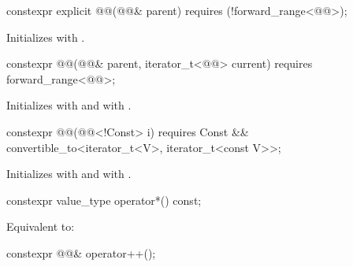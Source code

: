 %
\begin{itemdecl}
constexpr explicit @@(@@& parent)
  requires (!forward_range<@@>);
\end{itemdecl}

\begin{itemdescr}
\pnum
\effects
Initializes  with .
\end{itemdescr}

%
\begin{itemdecl}
constexpr @@(@@& parent, iterator_t<@@> current)
  requires forward_range<@@>;
\end{itemdecl}

\begin{itemdescr}
\pnum
\effects
Initializes  with 
and  with .
\end{itemdescr}

%
\begin{itemdecl}
constexpr @@(@@<!Const> i)
  requires Const && convertible_to<iterator_t<V>, iterator_t<const V>>;
\end{itemdecl}

\begin{itemdescr}
\pnum
\effects
Initializes  with  and
 with .
\end{itemdescr}

%
\begin{itemdecl}
constexpr value_type operator*() const;
\end{itemdecl}

\begin{itemdescr}
\pnum
\effects
Equivalent to: 
\end{itemdescr}

%
\begin{itemdecl}
constexpr @@& operator++();
\end{itemdecl}

